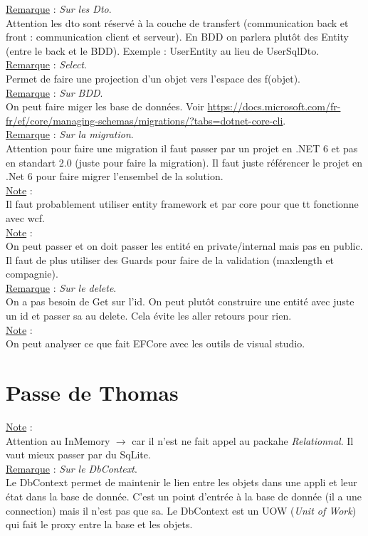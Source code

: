 \documentclass[a4paper,12pt,twoside]{article}
\newcommand{\rem}[2]{\noindent\underline{Remarque} : \textit{#1}.\\ \indent #2}
\newcommand{\note}[1]{\noindent\underline{Note} : \\ \indent #1}
\begin{document}
\rem{Sur les Dto}{Attention les dto sont réservé à la couche de transfert (communication back et front : communication client et serveur). En BDD on parlera plutôt des Entity (entre le back et le BDD). Exemple : UserEntity au lieu de UserSqlDto.}\\

\rem{Select}{Permet de faire une projection d'un objet vers l'espace des f(objet).}\\

\rem{Sur BDD}{On peut faire miger les base de données. Voir \url{https://docs.microsoft.com/fr-fr/ef/core/managing-schemas/migrations/?tabs=dotnet-core-cli}.}\\

\rem{Sur la migration}{Attention pour faire une migration il faut passer par un projet en .NET 6 et pas en standart 2.0 (juste pour faire la migration). Il faut juste référencer le projet en .Net 6 pour faire migrer l'ensembel de la solution.}\\

\note{Il faut probablement utiliser entity framework et par core pour que tt fonctionne avec wcf.}\\

\note{On peut passer et on doit passer les entité en private/internal mais pas en public. Il faut de plus utiliser des Guards pour faire de la validation (maxlength et compagnie).}\\

\rem{Sur le delete}{On a pas besoin de Get sur l'id. On peut plutôt construire une entité avec juste un id et passer sa au delete. Cela évite les aller retours pour rien.}\\

\note{On peut analyser ce que fait EFCore avec les outils de visual studio.}\\

\section{Passe de Thomas}

\note{Attention au InMemory $\to$ car il n'est ne fait appel au packahe \textit{Relationnal}. Il vaut mieux passer par du SqLite.}\\

\rem{Sur le DbContext}{Le DbContext permet de maintenir le lien entre les objets dans une appli et leur état dans la base de donnée. C'est un point d'entrée à la base de donnée (il a une connection) mais il n'est pas que sa. Le DbContext est un UOW (\textit{Unit of Work}) qui fait le proxy entre la base et les objets.}\\
\end{document}
